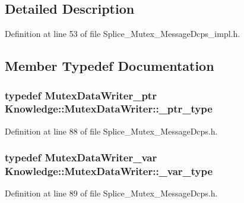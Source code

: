 \subsection{Detailed Description}


Definition at line 53 of file Splice\_\-Mutex\_\-MessageDcps\_\-impl.h.



\subsection{Member Typedef Documentation}
\hypertarget{classKnowledge_1_1MutexDataWriter_a3770228b7ac3f52d1d49afe8d016bead}{
\subsubsection[{\_\-ptr\_\-type}]{\setlength{\rightskip}{0pt plus 5cm}typedef {\bf MutexDataWriter\_\-ptr} {\bf Knowledge::MutexDataWriter::\_\-ptr\_\-type}}}
\label{d7/dc9/classKnowledge_1_1MutexDataWriter_a3770228b7ac3f52d1d49afe8d016bead}


Definition at line 88 of file Splice\_\-Mutex\_\-MessageDcps.h.

\hypertarget{classKnowledge_1_1MutexDataWriter_a71f41386a05e03eb544638b42e64cddf}{
\subsubsection[{\_\-var\_\-type}]{\setlength{\rightskip}{0pt plus 5cm}typedef {\bf MutexDataWriter\_\-var} {\bf Knowledge::MutexDataWriter::\_\-var\_\-type}}}
\label{d7/dc9/classKnowledge_1_1MutexDataWriter_a71f41386a05e03eb544638b42e64cddf}


Definition at line 89 of file Splice\_\-Mutex\_\-MessageDcps.h.



